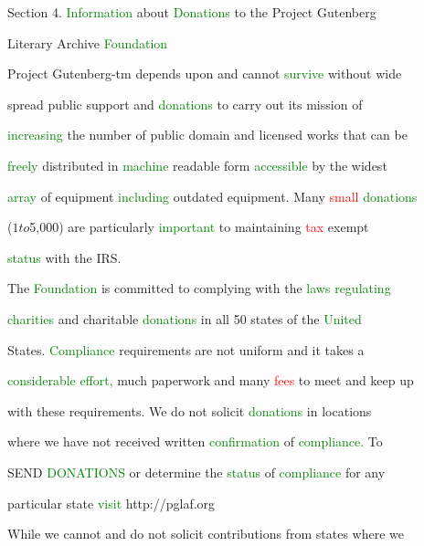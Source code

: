  Section 4. \textcolor{green}{Information} about \textcolor{green}{Donations} to the Project Gutenberg

 Literary Archive \textcolor{green}{Foundation}



 Project Gutenberg-tm depends upon and cannot \textcolor{green}{survive} without wide

 spread \textcolor{BurntOrange}{public} support and \textcolor{green}{donations} to carry out its mission of

 \textcolor{green}{increasing} the number of \textcolor{BurntOrange}{public} domain and licensed works that can be

 \textcolor{green}{freely} distributed in \textcolor{green}{machine} readable form \textcolor{green}{accessible} by the widest

 \textcolor{green}{array} of equipment \textcolor{green}{including} outdated equipment. Many \textcolor{red}{small} \textcolor{green}{donations}

 ($1 to $5,000) are particularly \textcolor{green}{important} to maintaining \textcolor{red}{tax} exempt

 \textcolor{green}{status} with the IRS.



 The \textcolor{green}{Foundation} is committed to complying with the \textcolor{green}{laws} \textcolor{green}{regulating}

 \textcolor{green}{charities} and \textcolor{BurntOrange}{charitable} \textcolor{green}{donations} in all 50 states of the \textcolor{green}{United}

 States. \textcolor{green}{Compliance} requirements are not uniform and it takes a

 \textcolor{green}{considerable} \textcolor{green}{effort,} much paperwork and many \textcolor{red}{fees} to meet and keep up

 with these requirements. We do not solicit \textcolor{green}{donations} in locations

 where we have not received written \textcolor{green}{confirmation} of \textcolor{green}{compliance.} To

 SEND \textcolor{green}{DONATIONS} or determine the \textcolor{green}{status} of \textcolor{green}{compliance} for any

 particular state \textcolor{green}{visit} http://pglaf.org



 While we cannot and do not solicit contributions from states where we

